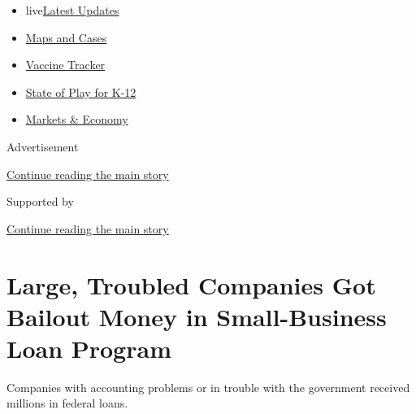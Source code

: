 \begin{itemize}
\tightlist
\item
  live\href{https://www.nytimes.com/2020/08/17/world/coronavirus-covid.html?name=styln-coronavirus-markets\&region=TOP_BANNER\&variant=undefined\&block=storyline_menu_recirc\&action=click\&pgtype=Article\&impression_id=0c3bba11-e0fd-11ea-bca3-17fca13c9abe}{Latest
  Updates}
\item
  \href{https://www.nytimes.com/interactive/2020/us/coronavirus-us-cases.html?name=styln-coronavirus-markets\&region=TOP_BANNER\&variant=undefined\&block=storyline_menu_recirc\&action=click\&pgtype=Article\&impression_id=0c3bba12-e0fd-11ea-bca3-17fca13c9abe}{Maps
  and Cases}
\item
  \href{https://www.nytimes.com/interactive/2020/science/coronavirus-vaccine-tracker.html?name=styln-coronavirus-markets\&region=TOP_BANNER\&variant=undefined\&block=storyline_menu_recirc\&action=click\&pgtype=Article\&impression_id=0c3bba13-e0fd-11ea-bca3-17fca13c9abe}{Vaccine
  Tracker}
\item
  \href{https://www.nytimes.com/2020/08/17/us/k-12-schools-reopening.html?name=styln-coronavirus-markets\&region=TOP_BANNER\&variant=undefined\&block=storyline_menu_recirc\&action=click\&pgtype=Article\&impression_id=0c3bba14-e0fd-11ea-bca3-17fca13c9abe}{State
  of Play for K-12}
\item
  \href{https://www.nytimes.com/live/2020/08/17/business/stock-market-today-coronavirus?name=styln-coronavirus-markets\&region=TOP_BANNER\&variant=undefined\&block=storyline_menu_recirc\&action=click\&pgtype=Article\&impression_id=0c3bba15-e0fd-11ea-bca3-17fca13c9abe}{Markets
  \& Economy}
\end{itemize}

Advertisement

\protect\hyperlink{after-top}{Continue reading the main story}

Supported by

\protect\hyperlink{after-sponsor}{Continue reading the main story}

\hypertarget{large-troubled-companies-got-bailout-money-in-small-business-loan-program}{%
\section{Large, Troubled Companies Got Bailout Money in Small-Business
Loan
Program}\label{large-troubled-companies-got-bailout-money-in-small-business-loan-program}}

Companies with accounting problems or in trouble with the government
received millions in federal loans.

